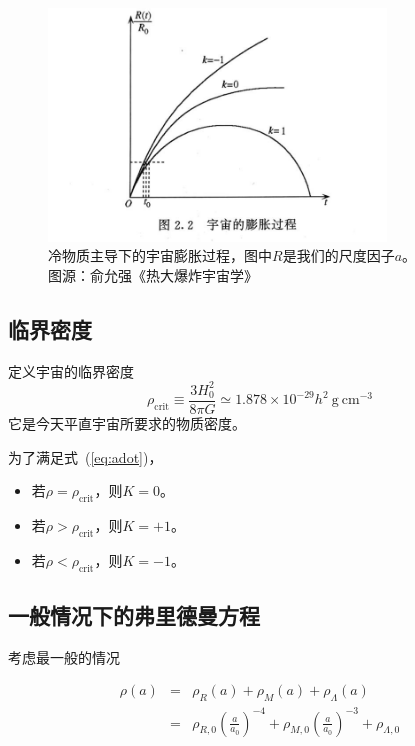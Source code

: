 \documentclass[12pt]{ctexart}
\newcommand{\refeq}[1]{式~(\ref{#1})}
\begin{document}
\begin{figure}[!hbtp]
    \centering
    \includegraphics[width=0.8\textwidth]{figures/expansion_k.jpg}
    \caption{冷物质主导下的宇宙膨胀过程，图中$R$是我们的尺度因子$a$。\\ 图源：俞允强《热大爆炸宇宙学》}
    \label{fig:expansion_k}
\end{figure}


\subsection{临界密度}
定义宇宙的临界密度
\begin{equation}
    \rho_\text{crit} \equiv \frac{3H_0^2}{8\pi G} \simeq 1.878\times 10^{-29} h^2 \mathrm{~g~cm^{-3}}
\end{equation}
它是今天平直宇宙所要求的物质密度。


为了满足\refeq{eq:adot}，
\begin{itemize}
    \item 若$\rho=\rho_\text{crit}$，则$K=0$。
    \item 若$\rho>\rho_\text{crit}$，则$K=+1$。
    \item 若$\rho<\rho_\text{crit}$，则$K=-1$。
\end{itemize}

\subsection{一般情况下的弗里德曼方程}

考虑最一般的情况

\begin{eqnarray}
    \rho(a) &=& \rho_R(a) + \rho_M(a) + \rho_\Lambda (a) \label{eq:rho}
    \\ &=& \rho_{R,0}\left(\frac{a}{a_0}\right)^{-4} + \rho_{M,0}\left(\frac{a}{a_0}\right)^{-3}  + \rho_{\Lambda,0}     
\end{eqnarray}
\end{document}
